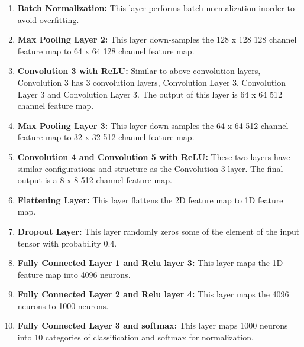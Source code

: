 \documentclass[12pt]{article}
\begin{document}
\begin{enumerate}
	 \item \textbf{Batch Normalization: } This layer performs batch normalization inorder to avoid overfitting.
	 	 
	 \item \textbf{Max Pooling Layer 2:} This layer down-samples the 128 x 128 128 channel feature map to 64 x 64 128 channel feature map.
	 
	 \item \textbf{Convolution 3 with ReLU:} Similar to above convolution layers, Convolution 3 has 3 convolution layers, Convolution Layer 3, Convolution Layer 3 and Convolution Layer 3. The output of this layer is 64 x 64 512 channel feature map. 
	 	 
	 \item \textbf{Max Pooling Layer 3:} This layer down-samples the 64 x 64 512 channel feature map to 32 x 32 512 channel feature map.
	 
	 \item \textbf{Convolution 4 and Convolution 5 with ReLU: } These two layers have similar configurations and structure as the Convolution 3 layer. The final output is a 8 x 8 512 channel feature map. 
	 
	 \item \textbf{Flattening Layer: } This layer flattens the 2D feature map to 1D feature map. 
	 
	 \item \textbf{Dropout Layer:} This layer randomly zeros some of the element of the input tensor with probability 0.4. 
	 
	 \item \textbf{Fully Connected Layer 1 and Relu layer 3:} This layer maps the 1D feature map into 4096 neurons. 
	 
	 \item \textbf{Fully Connected Layer 2 and Relu layer 4:} This layer maps the 4096 neurons to 1000 neurons.
	 
	 \item \textbf{Fully Connected Layer 3 and softmax:} This layer maps 1000 neurons into 10 categories of classification and softmax for normalization. 
	 
\end{enumerate}
\end{document}
